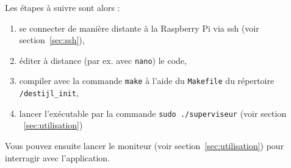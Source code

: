 \documentclass[11pt]{paper}
\newcommand{\raspi}{Raspberry Pi\xspace}
\begin{document}
Les étapes à suivre sont alors :
\begin{enumerate}
\item se connecter de manière distante à la \raspi via ssh (voir section~\ref{sec:ssh}),
 \item éditer à distance (par ex. avec {\tt nano}) le code,
 \item compiler avec la commande {\tt make} à l'aide du {\tt Makefile} du répertoire {\tt /destijl\_init},
 \item lancer l'exécutable par la commande {\tt sudo ./superviseur} (voir section ~\ref{sec:utilisation})\\
\end{enumerate}

Vous pouvez ensuite lancer le moniteur (voir section~\ref{sec:utilisation}) pour interragir avec l'application.
\end{document}
